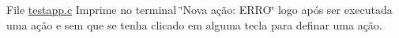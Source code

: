 
\begin{DoxyRefList}
\item[File \mbox{\hyperlink{testapp_8c}{testapp.c}} ]\label{bug__bug000002}%
%
Imprime no terminal \char`\"{}\+Nova ação\+: E\+R\+R\+O\char`\"{} logo após ser executada uma ação e sem que se tenha clicado em alguma tecla para definar uma ação.
\end{DoxyRefList}
